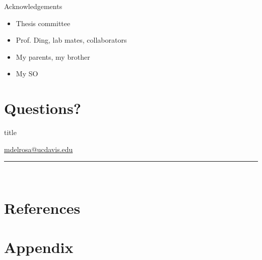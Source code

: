\documentclass{beamer}
\begin{document}
  \begin{frame}{Acknowledgements}
    \begin{itemize}
      \item Thesis committee
      \pause
      \item Prof. Ding, lab mates, collaborators
      \pause
      \item My parents, my brother
      \pause
      \item My SO
    \end{itemize}
  \end{frame}

\section*{Questions?}
    \begin{frame}[plain]
        \vfill
      \centering
      \begin{beamercolorbox}[sep=8pt,center,shadow=true,rounded=true]{title}
        \insertsectionhead\par%
        \small{\url{mdelrosa@ucdavis.edu}}
        \color{davisblue}\noindent\rule{10cm}{1pt} \\
      \end{beamercolorbox}
      \vfill
      \begin{figure}[htb] \centering 
      {
        \fontsize{4pt}{4pt}
        \def\svgwidth{\columnwidth}
        
      }
      \end{figure}
    \end{frame}

\section*{References}

\section*{Appendix}
\end{document}
